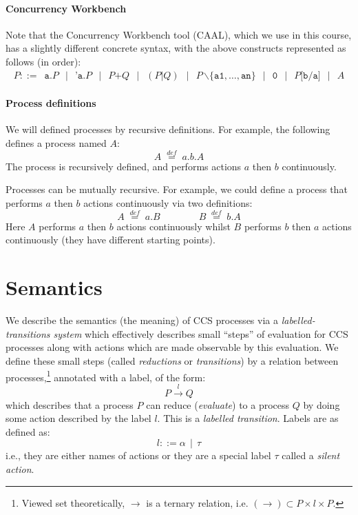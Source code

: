 \documentclass{article}
\theoremstyle{definition}
\begin{document}
\paragraph{Concurrency Workbench}
Note that the Concurrency Workbench tool (CAAL), which we use
in this course, has a slightly different
concrete syntax, with the above constructs represented as follows (in order):
%
\begin{align*}
P ::= \;\ \texttt{a} . P \;\,\mid\;\, \texttt{'a} .P \;\,\mid\;\, P \texttt{+} Q \;\,\mid\;\, (P \texttt{|} Q)
\;\,\mid\;\, P \, \texttt{$\backslash\{$}\texttt{a1}, \ldots, \texttt{an}\texttt{$\}$}
\;\,\mid\;\, \texttt{0} \;\,\mid\;\, P\texttt{[b/a]} \;\,\mid\;\, A
\end{align*}

\paragraph{Process definitions}

We will defined processes by recursive definitions. For example, the
following defines a process named $A$:
%
\begin{equation*}
A \; {\mathrel{\mathop{=}\limits^{{def}}}} \; a.b.A
\end{equation*}
%
The process is recursively defined, and performs actions $a$ then $b$ 
continuously.

Processes can be mutually recursive. For example, we could
define a process that performs $a$ then $b$ actions
continuously via two definitions:
%
\begin{equation*}
  A \; {\mathrel{\mathop{=}\limits^{{def}}}} \; a.B
  \qquad\qquad
  B \; {\mathrel{\mathop{=}\limits^{{def}}}} \; b.A
\end{equation*}
%
Here $A$ performs $a$ then $b$ actions
continuously whilst $B$ performs $b$ then $a$ actions
continuously (they have different starting points).

\vspace{-1em}
\section{Semantics}

We describe the semantics (the meaning) of CCS processes via a
\emph{labelled-transitions system} which effectively describes small
``steps'' of evaluation for CCS processes along with actions which are
made observable by this evaluation.  We define these small steps
(called \emph{reductions} or \emph{transitions})
by a relation between processes,\footnote{Viewed set theoretically,
  $\rightarrow$ is a ternary relation, i.e.
  $(\rightarrow) \subset P \times l \times P$.}  annotated with a
label, of the form:
%
\begin{equation*}
P \xrightarrow{l} Q
\end{equation*}
%
which describes that a process $P$ can reduce (\emph{evaluate}) to a
process $Q$ by doing some action described by the label $l$.
This is a \emph{labelled transition}.
Labels are as defined as:
$$l ::= \alpha \,\mid\, \tau$$
i.e., they are
either names of actions or they are a special label $\tau$ called a
\emph{silent action}.
\end{document}
